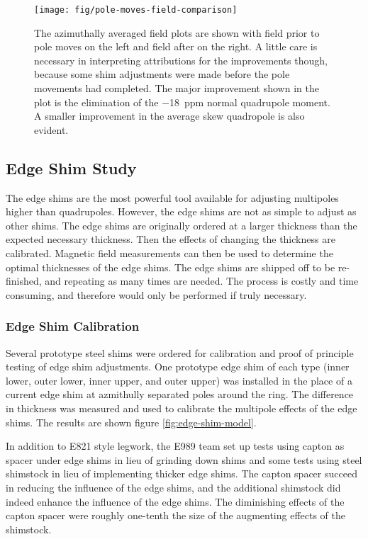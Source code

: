\begin{figure}
\centering
\texttt{[image: fig/pole-moves-field-comparison]}
\caption{
    The azimuthally averaged field plots are shown with field prior to pole moves on the left and field after on the right.  A little care is necessary in interpreting attributions for the improvements though, because some shim adjustments were made before the pole movements had completed.  The major improvement shown in the plot is the elimination of the \SI{-18}{ppm} normal quadrupole moment.  A smaller improvement in the average skew quadropole is also evident. 
    \label{fig:pole-moves-field-comparison}
}
\end{figure}

\subsection{Edge Shim Study}

The edge shims are the most powerful tool available for adjusting multipoles higher than quadrupoles.  However, the edge shims are not as simple to adjust as other shims.  The edge shims are originally ordered at a larger thickness than the expected necessary thickness.  Then the effects of changing the thickness are calibrated.  Magnetic field measurements can then be used to determine the optimal thicknesses of the edge shims.  The edge shims are shipped off to be re-finished, and repeating as many times are needed.  The process is costly and time consuming, and therefore would only be performed if truly necessary.

\subsubsection{Edge Shim Calibration}

Several prototype steel shims were ordered for calibration and proof of principle testing of edge shim adjustments.  One prototype edge shim of each type (inner lower, outer lower, inner upper, and outer upper) was installed in the place of a current edge shim at azmithully separated poles around the ring.  The difference in thickness was measured and used to calibrate the multipole effects of the edge shims.  The results are shown figure \ref{fig:edge-shim-model}. 

In addition to E821 style legwork, the E989 team set up tests using capton as spacer under edge shims in lieu of grinding down shims and some tests using steel shimstock in lieu of implementing thicker edge shims.  The capton spacer succeed in reducing the influence of the edge shims, and the additional shimstock did indeed enhance the influence of the edge shims.  The diminishing effects of the capton spacer were roughly one-tenth the size of the augmenting effects of the shimstock.

